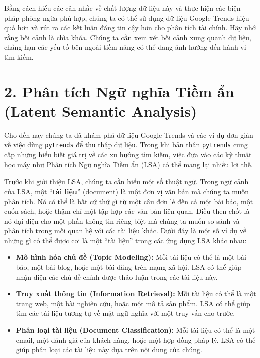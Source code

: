 Bằng cách hiểu các cân nhắc về chất lượng dữ liệu này và thực hiện các biện pháp phòng ngừa phù hợp, chúng ta có thể sử dụng dữ liệu Google Trends hiệu quả hơn và rút ra các kết luận đáng tin cậy hơn cho phân tích tài chính. Hãy nhớ rằng bối cảnh là chìa khóa. Chúng ta cần xem xét bối cảnh xung quanh dữ liệu, chẳng hạn các yếu tố bên ngoài tiềm năng có thể đang ảnh hưởng đến hành vi tìm kiếm.

\section*{2. Phân tích Ngữ nghĩa Tiềm ẩn (Latent Semantic Analysis)}

Cho đến nay chúng ta đã khám phá dữ liệu Google Trends và các ví dụ đơn giản về việc dùng \texttt{pytrends} để thu thập dữ liệu. Trong khi bản thân \texttt{pytrends} cung cấp những hiểu biết giá trị về các xu hướng tìm kiếm, việc đưa vào các kỹ thuật học máy như Phân tích Ngữ nghĩa Tiềm ẩn (LSA) có thể mang lại nhiều lợi thế.

Trước khi giới thiệu LSA, chúng ta cần hiểu một số thuật ngữ. Trong ngữ cảnh của LSA, một ``\textbf{tài liệu}'' (document) là một đơn vị văn bản mà chúng ta muốn phân tích. Nó có thể là bất cứ thứ gì từ một câu đơn lẻ đến cả một bài báo, một cuốn sách, hoặc thậm chí một tập hợp các văn bản liên quan. Điều then chốt là nó đại diện cho một phần thông tin riêng biệt mà chúng ta muốn so sánh và phân tích trong mối quan hệ với các tài liệu khác. Dưới đây là một số ví dụ về những gì có thể được coi là một ``tài liệu'' trong các ứng dụng LSA khác nhau:

\begin{itemize}
  \item \textbf{Mô hình hóa chủ đề (Topic Modeling):} Mỗi tài liệu có thể là một bài báo, một bài blog, hoặc một bài đăng trên mạng xã hội. LSA có thể giúp nhận diện các chủ đề chính được thảo luận trong các tài liệu này.
  \item \textbf{Truy xuất thông tin (Information Retrieval):} Mỗi tài liệu có thể là một trang web, một bài nghiên cứu, hoặc một mô tả sản phẩm. LSA có thể giúp tìm các tài liệu tương tự về mặt ngữ nghĩa với một truy vấn cho trước.
  \item \textbf{Phân loại tài liệu (Document Classification):} Mỗi tài liệu có thể là một email, một đánh giá của khách hàng, hoặc một hợp đồng pháp lý. LSA có thể giúp phân loại các tài liệu này dựa trên nội dung của chúng.
\end{itemize}

